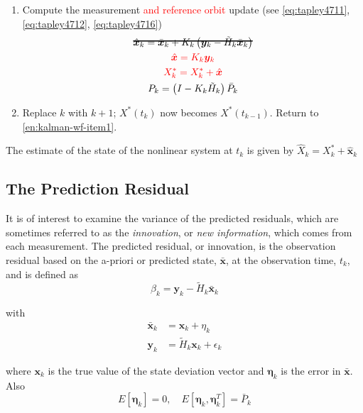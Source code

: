 \begin{enumerate}
	\item Compute the measurement \textcolor{red}{and reference orbit} update (see \ref{eq:tapley4711}, \ref{eq:tapley4712}, \ref{eq:tapley4716})
	      \begin{subequations}
		      \begin{gather}
			      \hcancel{\hat{\bm{x}}_k = \bar{\bm{x}}_k + K_k \left( \bm{y}_k - \tilde{H}_k \bar{\bm{x}}_k \right)} \\
			      \textcolor{red}{\hat{\bm{x}} = K_k \bm{y}_k} \\
			      \textcolor{red}{X^*_k = X^*_k + \hat{\bm{x}}} \\
			      P_k = \left( I - K_k \tilde{H}_k \right) \bar{P}_k
		      \end{gather}
	      \end{subequations}

	\item Replace \(k\) with \(k+1\); \(X^*(t_k)\) now becomes \(X^*(t_{k-1})\).
	      Return to \ref{en:kalman-wf-item1}.

\end{enumerate}

The estimate of the state of the nonlinear system at \(t_k\) is given by
\(\hat{X}_k = X^*_k + \hat{\bm{x}}_k\)

\subsection{The Prediction Residual}
It is of interest to examine the variance of the predicted residuals, which are
sometimes referred to as the \emph{innovation}, or \emph{new information}, which
comes from each measurement. The predicted residual, or innovation, is the observation
residual based on the a-priori or predicted state, \(\bar{\bm{x}}\), at the observation
time, \(t_k\), and is defined as
\begin{equation}
	\label{eq:tapley4733}
	\beta _k = \bm{y}_k - \tilde{H}_k \bar{\bm{x}}_k
\end{equation}

with
\begin{equation}
	\begin{aligned}
		\bar{\bm{x}}_k & = \bm{x}_k + \eta _k                 \\
		\bm{y}_k       & = \tilde{H}_k \bm{x}_k + \epsilon _k
	\end{aligned}
\end{equation}

where \(\bm{x}_k\) is the true value of the state deviation vector and \(\bm{\eta}_k\)
is the error in \(\bar{\bm{x}}\). Also
\begin{equation}
	E \left[ \bm{\eta}_k \right] = 0, \quad
	E \left[ \bm{\eta}_k , \bm{\eta}^T_k \right] = \bar{P}_k
\end{equation}

